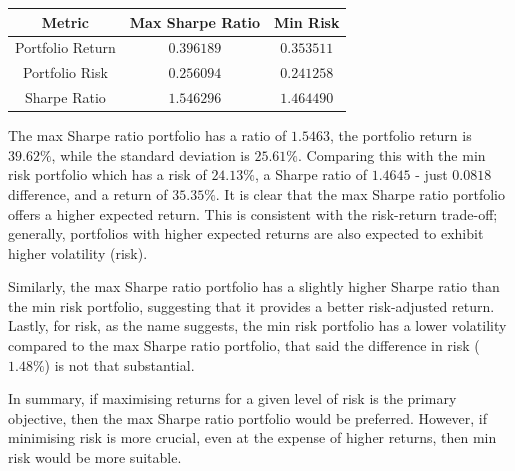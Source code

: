 \documentclass[a4paper,12pt,titlepage]{article}
\numberwithin{equation}{section}
\begin{document}
\begin{tcolorbox}[colback=red!5, colframe=red!75!black, title=\textbf{Max Sharpe Ratio vs Min Risk}]
\begin{center}

		\begin{tabular}{|c|c|c|}
		\hline
		\textbf{Metric} & \textbf{Max Sharpe Ratio} & \textbf{Min Risk} \\
		\hline
		Portfolio Return & $0.396189$ & $0.353511$ \\
		\hline
		Portfolio Risk & $0.256094$ & $0.241258$ \\
		\hline
		Sharpe Ratio & $1.546296$ & $1.464490$ \\
		\hline
		\end{tabular}

	\end{center}
		
	The max Sharpe ratio portfolio has a ratio of $1.5463$, the portfolio return is $39.62\%$, 
	while the standard deviation is $25.61\%$. Comparing this with the min risk portfolio which has a 
	risk of $24.13\%$, a Sharpe ratio of $1.4645$ - just $0.0818$ difference, and a return of $35.35\%$. 
	It is clear that the max Sharpe ratio portfolio offers a higher expected return. This is consistent with the risk-return 
	trade-off; generally, portfolios with higher expected returns are also expected to exhibit higher 
	volatility (risk). \newline \par \noindent Similarly, the max Sharpe ratio portfolio has a slightly higher Sharpe ratio 
	than the min risk portfolio, suggesting that it provides a better risk-adjusted return. Lastly, for risk, as the name suggests, 
	the min risk portfolio has a lower volatility compared to the max Sharpe ratio portfolio, that said the difference in risk ($1.48\%$) 
	is not that substantial. \newline \par \noindent In summary, if maximising returns for a given level of 
	risk is the primary objective, then the max Sharpe ratio portfolio would be preferred. However, if minimising risk is more 
	crucial, even at the expense of higher returns, then min risk would be more suitable.

\end{tcolorbox}
\end{document}
